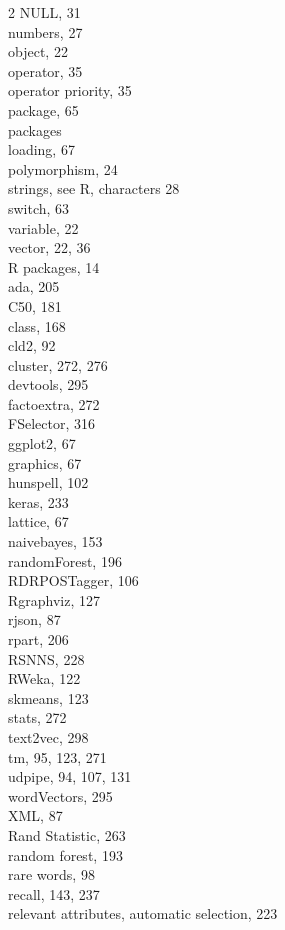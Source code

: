 \documentclass[twoside,11pt]{book}
\begin{document}
\begin{multicols}{2}
NULL, 31\\
numbers, 27\\
object, 22\\
operator, 35\\
operator priority, 35\\
package, 65\\
packages\\
loading, 67\\
polymorphism, 24\\
strings, see R, characters 28\\
switch, 63\\
variable, 22\\
vector, 22, 36\\
R packages, 14\\
ada, 205\\
C50, 181\\
class, 168\\
cld2, 92\\
cluster, 272, 276\\
devtools, 295\\
factoextra, 272\\
FSelector, 316\\
ggplot2, 67\\
graphics, 67\\
hunspell, 102\\
keras, 233\\
lattice, 67\\
naivebayes, 153\\
randomForest, 196\\
RDRPOSTagger, 106\\
Rgraphviz, 127\\
rjson, 87\\
rpart, 206\\
RSNNS, 228\\
RWeka, 122\\
skmeans, 123\\
stats, 272\\
text2vec, 298\\
tm, 95, 123, 271\\
udpipe, 94, 107, 131\\
wordVectors, 295\\
XML, 87\\
Rand Statistic, 263\\
random forest, 193\\
rare words, 98\\
recall, 143, 237\\
relevant attributes, automatic selection, 223\\

\end{multicols}
\end{document}
